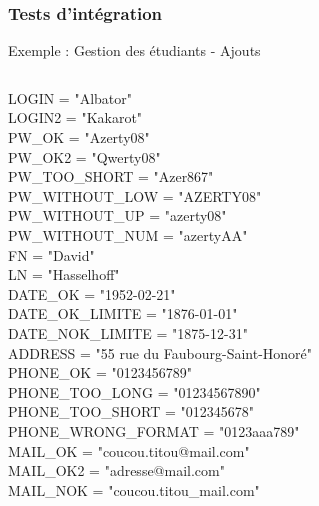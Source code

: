 \documentclass{beamer}
\begin{document}
      \begin{frame}
        \frametitle{Tests d'intégration}
        \begin{block}{Exemple : Gestion des étudiants - Ajouts}
          \begin{columns}
            \begin{column}{.5\textwidth}
              \begin{center}
                \begin{tiny}
                  LOGIN = "Albator"\\
                  LOGIN2 = "Kakarot"\\
                  PW\_OK = "Azerty08"\\
                  PW\_OK2 = "Qwerty08"\\
                  PW\_TOO\_SHORT = "Azer867"\\
                  PW\_WITHOUT\_LOW = "AZERTY08"\\
                  PW\_WITHOUT\_UP = "azerty08"\\
                  PW\_WITHOUT\_NUM = "azertyAA"\\
                  FN = "David"\\
                  LN = "Hasselhoff"\\
                  DATE\_OK = "1952-02-21"\\
                  DATE\_OK\_LIMITE = "1876-01-01"\\
                  DATE\_NOK\_LIMITE = "1875-12-31"\\
                  ADDRESS = "55 rue du Faubourg-Saint-Honoré"\\
                  PHONE\_OK = "0123456789"\\
                  PHONE\_TOO\_LONG = "01234567890"\\
                  PHONE\_TOO\_SHORT = "012345678"\\
                  PHONE\_WRONG\_FORMAT = "0123aaa789"\\
                  MAIL\_OK = "coucou.titou@mail.com"\\
                  MAIL\_OK2 = "adresse@mail.com"\\
                  MAIL\_NOK = "coucou.titou\_mail.com"\\
                \end{tiny}
              \end{center}
            \end{column}
            \begin{column}{.5\textwidth}

\end{column}
\end{columns}
\end{block}
\end{frame}
\end{document}
